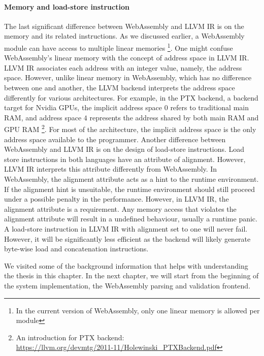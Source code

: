\paragraph{Memory and load-store instruction}
The last significant difference between WebAssembly and LLVM IR is on the memory
and its related instructions. As we discussed earlier, a WebAssembly module can
have access to multiple linear memories \footnote{In the current version of
  WebAssembly, only one linear memory is allowed per module}. One might confuse
WebAssembly's linear memory with the concept of address space in LLVM IR. LLVM
IR associates each address with an integer value, namely, the address space.
However, unlike linear memory in WebAssembly, which has no difference between
one and another, the LLVM backend interprets the address space differently for
various architectures. For example, in the PTX backend, a backend target for
Nvidia GPUs, the implicit address space $0$ refers to traditional main RAM, and
address space $4$ represents the address shared by both main RAM and GPU RAM
\footnote{An introduction for PTX backend:
  \\\url{https://llvm.org/devmtg/2011-11/Holewinski_PTXBackend.pdf}}. For most
of the architecture, the implicit address space is the only address space
available to the programmer. Another difference between WebAssembly and LLVM IR
is on the design of load-store instructions. Load store instructions in both
languages have an attribute of alignment. However, LLVM IR interprets this
attribute differently from WebAssembly. In WebAssembly, the alignment attribute
acts as a hint to the runtime environment. If the alignment hint is unsuitable,
the runtime environment should still proceed under a possible penalty in the
performance. However, in LLVM IR, the alignment attribute is a requirement.
Any memory access that violates the alignment attribute will result in a
undefined behaviour, usually a runtime panic. A load-store instruction in LLVM
IR with alignment set to one will never fail. However, it will be significantly
less efficient as the backend will likely generate byte-wise load and
concatenation instructions.

We visited some of the background information that helps with understanding the
thesis in this chapter. In the next chapter, we will start from the beginning of
the system implementation, the WebAssembly parsing and validation frontend.